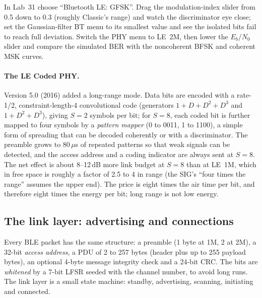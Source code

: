 \begin{tryit}
In Lab~31 choose ``Bluetooth LE: GFSK''. Drag the modulation-index slider from 0.5 down to 0.3
(roughly Classic's range) and watch the discriminator eye close; set the Gaussian-filter BT menu to
its smallest value and see the isolated bits fail to reach full deviation. Switch the PHY menu to
LE~2M, then lower the $E_b/N_0$ slider and compare the simulated BER with the noncoherent BFSK and
coherent MSK curves.
\end{tryit}

\paragraph{The LE Coded PHY.} Version 5.0 (2016) added a long-range mode. Data bits are encoded with
a rate-1/2, constraint-length-4 convolutional code (generators $1+D+D^2+D^3$ and $1+D^2+D^3$),
giving $S=2$ symbols per bit; for $S=8$, each coded bit is further mapped to four symbols by a
\emph{pattern mapper} (0 to 0011, 1 to 1100), a simple form of spreading that can be decoded
coherently or with a discriminator. The preamble grows to 80\,$\mu$s of repeated patterns so that weak
signals can be detected, and the access address and a coding indicator are always sent at $S=8$.
The net effect is about 8--12\,dB more link budget at $S=8$ than at LE~1M, which in free space is
roughly a factor of 2.5 to 4 in range (the SIG's ``four times the range'' assumes the upper end).
The price is eight times the air time per bit, and therefore eight times the energy per bit; long
range is not low energy.

\subsection{The link layer: advertising and connections}

Every BLE packet has the same structure: a preamble (1 byte at 1M, 2 at 2M), a 32-bit \emph{access
address}, a PDU of 2 to 257 bytes (header plus up to 255 payload bytes), an optional 4-byte message
integrity check and a 24-bit CRC. The bits are \emph{whitened} by a 7-bit LFSR seeded with the
channel number, to avoid long runs. The link layer is a small state machine: standby, advertising,
scanning, initiating and connected.

